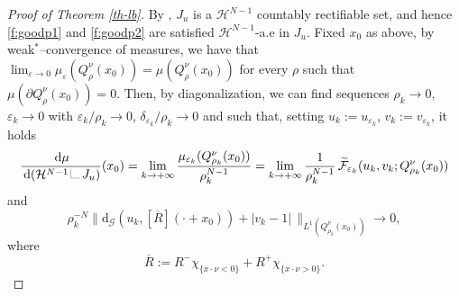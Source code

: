\documentclass[a4paper,reqno]{amsart}
\newcommand{\dG}{\mathrm{d}_{\G}}
\newcommand\calH{\mathcal{H}}
\newcommand\di{{\,\mathrm{d}}}
\newcommand{\LM}[1]{\hbox{\vrule width.2pt \vbox to#1pt{\vfill \hrule width#1pt height.2pt}}}
\newcommand{\LL}{{\mathchoice
{\,\LM7\,}{\,\LM7\,}{\,\LM5\,}{\,\LM{3.35}\,}}}
\theoremstyle{remark}
\def\e{\varepsilon}
\newcommand{\F}{\mathcal{F}}
\newcommand{\G}{\mathcal{G}}
\newcommand{\tF}{\widetilde{\F}}
\numberwithin{equation}{section}
\begin{document}
\begin{proof}[Proof of Theorem \ref{th-lb}]
	By \cite[Theorem 2.3]{Amb90SBVX}, $J_u$ is a $\calH^{N-1}$ countably rectifiable set, and hence \eqref{f:goodp1} and \eqref{f:goodp2} are satisfied $\calH^{N-1}$-a.e in $J_u$.
	Fixed $x_0$ as above,
	by weak$^*$--convergence of measures, we have that $\lim_{\e \to 0}\mu_\e (Q^\nu_\rho(x_0))= \mu (Q^\nu_\rho(x_0))$ for every $\rho$ such that $\mu(\partial Q^\nu_\rho(x_0))=0$. Then, by diagonalization, we can find sequences
	$\rho_k\to0$,  $\e_k\to0$ 
	with $\e_k/\rho_k\to0$,
$\delta_{\e_k}/\rho_k\to0$ and
	such that, setting  $u_k:=u_{\e_k}$, $v_k:=v_{\e_k}$, it holds
	\[
	\frac{\di\mu}{\di(\calH^{N-1}\LL J_u)}(x_0)= \lim_{k\to +\infty}\frac{\mu_{\e_k}(Q^\nu_{\rho_k}(x_0))}{\rho_k^{N-1}}=
	\lim_{k\to +\infty} \frac 1{\rho_k^{N-1}}\, \tF_{\e_k} (u_k,v_k;  Q^\nu_{\rho_k}(x_0))
	\]
	and
	\begin{equation*}
\rho_k^{-N}\| \dG(u_k,[\overline R](\cdot+x_0)) + |v_k-1| \, \|_{L^1(Q^\nu_{\rho_k}(x_0))}\to0,
\end{equation*}
	where
\[
\overline R:= R^- \chi_{\{x\cdot \nu <0\} }+ R^+ \chi_{\{x\cdot \nu >0\}}.
\]


\end{proof}
\end{document}
